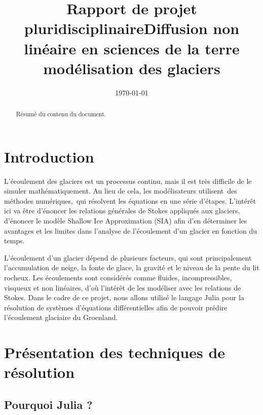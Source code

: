 \documentclass{article}
\begin{document}
\title{Rapport de projet pluridisciplinaire}

\date{\today}
        
\newpage

\title{Diffusion non linéaire en sciences de la terre modélisation des glaciers}
 
\maketitle
\tableofcontents

\begin{abstract}
Résumé du contenu du document.
\end{abstract}

\newpage
\section{Introduction}\label{sec:intro}

L’écoulement des glaciers est un processus continu, mais il est très difficile de le simuler mathématiquement. Au lieu de cela, les modélisateurs utilisent des méthodes numériques, qui résolvent les équations en une série d’étapes.
L’intérêt ici va être d’énoncer les relations générales de Stokes appliqués aux glaciers, d’énoncer le modèle Shallow Ice Approximation (SIA) afin d’en déterminer les avantages et les limites dans l’analyse de l’écoulement d’un glacier en fonction du temps.

L’écoulement d’un glacier dépend de plusieurs facteurs, qui sont principalement l’accumulation de neige, la fonte de glace, la gravité et le niveau de la pente du lit rocheux.
Les écoulements sont considérés comme fluides, incompressibles, visqueux et non linéaires, d’où l’intérêt de les modéliser avec les relations de Stokes.
Dans le cadre de ce projet, nous allons utilisé le langage Julia pour la résolution de systèmes d'équations différentielles afin de pouvoir prédire l'écoulement glaciaire du Groenland.


\section{Présentation des techniques de résolution}

\subsection{Pourquoi Julia ?}
\end{document}
